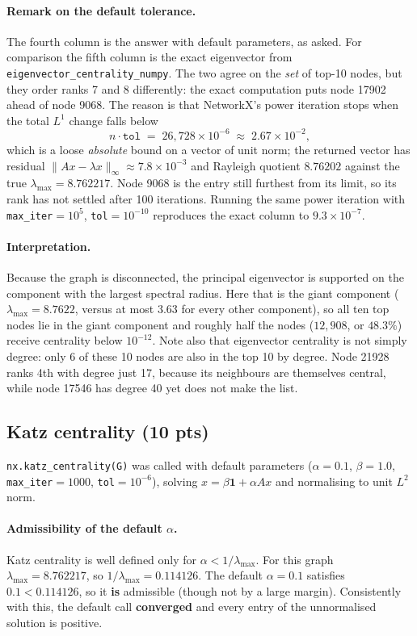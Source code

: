 \paragraph{Remark on the default tolerance.}
The fourth column is the answer with default parameters, as asked. For comparison
the fifth column is the exact eigenvector from
\texttt{eigenvector\_\-centrality\_\-numpy}. The two agree on the \emph{set} of
top-10 nodes, but they order ranks 7 and 8 differently: the exact computation puts
node 17902 ahead of node 9068. The reason is that NetworkX's power iteration stops
when the total $L^1$ change falls below
\[
  n\cdot\texttt{tol} \;=\; 26{,}728\times10^{-6} \;\approx\; 2.67\times10^{-2},
\]
which is a loose \emph{absolute} bound on a vector of unit norm; the returned
vector has residual $\lVert Ax-\lambda x\rVert_\infty\approx7.8\times10^{-3}$ and
Rayleigh quotient $8.76202$ against the true
$\lambda_{\max}=8.762217$. Node 9068 is the entry still
furthest from its limit, so its rank has not settled after 100 iterations. Running
the same power iteration with \texttt{max\_iter}$=10^5$, \texttt{tol}$=10^{-10}$
reproduces the exact column to $9.3\times10^{-7}$.

\paragraph{Interpretation.}
Because the graph is disconnected, the principal eigenvector is supported on the
component with the largest spectral radius. Here that is the giant component
($\lambda_{\max}=8.7622$, versus at most $3.63$ for every other component), so all
ten top nodes lie in the giant component and roughly half the nodes
($12{,}908$, or $48.3\%$) receive centrality below $10^{-12}$. Note also that
eigenvector centrality is not simply degree: only 6 of these 10 nodes are also in
the top 10 by degree. Node 21928 ranks 4th with degree just 17, because its
neighbours are themselves central, while node 17546 has degree 40 yet does not
make the list.

\subsection{Katz centrality (10 pts)}

\texttt{nx.katz\_centrality(G)} was called with default parameters
($\alpha=0.1$, $\beta=1.0$, \texttt{max\_iter}$=1000$, \texttt{tol}$=10^{-6}$),
solving $x=\beta\mathbf{1}+\alpha Ax$ and normalising to unit $L^2$ norm.

\paragraph{Admissibility of the default $\alpha$.}
Katz centrality is well defined only for $\alpha<1/\lambda_{\max}$. For this graph
$\lambda_{\max}=8.762217$, so $1/\lambda_{\max}=0.114126$. The default
$\alpha=0.1$ satisfies $0.1<0.114126$, so it \textbf{is} admissible (though not by
a large margin). Consistently with this, the default call \textbf{converged} and
every entry of the unnormalised solution is positive.

